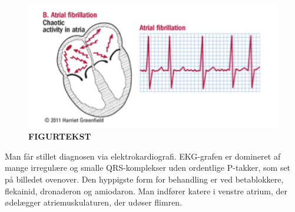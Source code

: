 \begin{figure}[htb]
	\centering
	\includegraphics[width=1\textwidth]{Figurer/Snip20150412_32}
	\caption{\textbf{FIGURTEKST}\protect\footnotemark}
\end{figure}

Man får stillet diagnosen via elektrokardiografi. EKG-grafen er domineret af mange irregulære og smalle QRS-komplekser uden ordentlige P-takker, som set på billedet ovenover. Den hyppigste form for behandling er ved betablokkere, flekainid, dronaderon og amiodaron. Man indfører katere i venstre atrium, der ødelægger atriemuskulaturen, der udøser flimren.








  